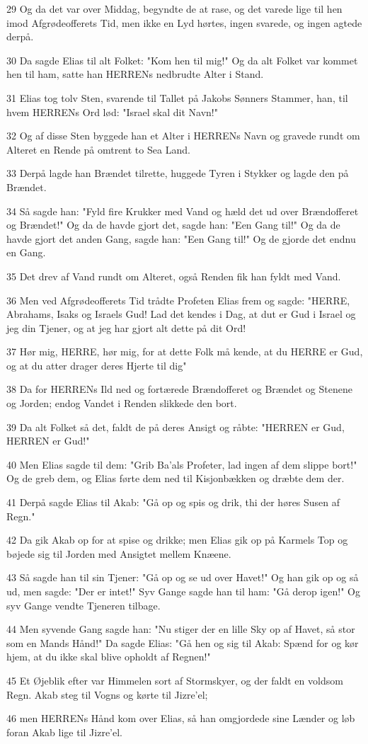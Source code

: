 \par 29 Og da det var over Middag, begyndte de at rase, og det varede lige til hen imod Afgrødeofferets Tid, men ikke en Lyd hørtes, ingen svarede, og ingen agtede derpå.
\par 30 Da sagde Elias til alt Folket: "Kom hen til mig!" Og da alt Folket var kommet hen til ham, satte han HERRENs nedbrudte Alter i Stand.
\par 31 Elias tog tolv Sten, svarende til Tallet på Jakobs Sønners Stammer, han, til hvem HERRENs Ord lød: "Israel skal dit Navn!"
\par 32 Og af disse Sten byggede han et Alter i HERRENs Navn og gravede rundt om Alteret en Rende på omtrent to Sea Land.
\par 33 Derpå lagde han Brændet tilrette, huggede Tyren i Stykker og lagde den på Brændet.
\par 34 Så sagde han: "Fyld fire Krukker med Vand og hæld det ud over Brændofferet og Brændet!" Og da de havde gjort det, sagde han: "Een Gang til!" Og da de havde gjort det anden Gang, sagde han: "Een Gang til!" Og de gjorde det endnu en Gang.
\par 35 Det drev af Vand rundt om Alteret, også Renden fik han fyldt med Vand.
\par 36 Men ved Afgrødeofferets Tid trådte Profeten Elias frem og sagde: "HERRE, Abrahams, Isaks og Israels Gud! Lad det kendes i Dag, at dut er Gud i Israel og jeg din Tjener, og at jeg har gjort alt dette på dit Ord!
\par 37 Hør mig, HERRE, hør mig, for at dette Folk må kende, at du HERRE er Gud, og at du atter drager deres Hjerte til dig"
\par 38 Da for HERRENs Ild ned og fortærede Brændofferet og Brændet og Stenene og Jorden; endog Vandet i Renden slikkede den bort.
\par 39 Da alt Folket så det, faldt de på deres Ansigt og råbte: "HERREN er Gud, HERREN er Gud!"
\par 40 Men Elias sagde til dem: "Grib Ba'als Profeter, lad ingen af dem slippe bort!" Og de greb dem, og Elias førte dem ned til Kisjonbækken og dræbte dem der.
\par 41 Derpå sagde Elias til Akab: "Gå op og spis og drik, thi der høres Susen af Regn."
\par 42 Da gik Akab op for at spise og drikke; men Elias gik op på Karmels Top og bøjede sig til Jorden med Ansigtet mellem Knæene.
\par 43 Så sagde han til sin Tjener: "Gå op og se ud over Havet!" Og han gik op og så ud, men sagde: "Der er intet!" Syv Gange sagde han til ham: "Gå derop igen!" Og syv Gange vendte Tjeneren tilbage.
\par 44 Men syvende Gang sagde han: "Nu stiger der en lille Sky op af Havet, så stor som en Mands Hånd!" Da sagde Elias: "Gå hen og sig til Akab: Spænd for og kør hjem, at du ikke skal blive opholdt af Regnen!"
\par 45 Et Øjeblik efter var Himmelen sort af Stormskyer, og der faldt en voldsom Regn. Akab steg til Vogns og kørte til Jizre'el;
\par 46 men HERRENs Hånd kom over Elias, så han omgjordede sine Lænder og løb foran Akab lige til Jizre'el.

